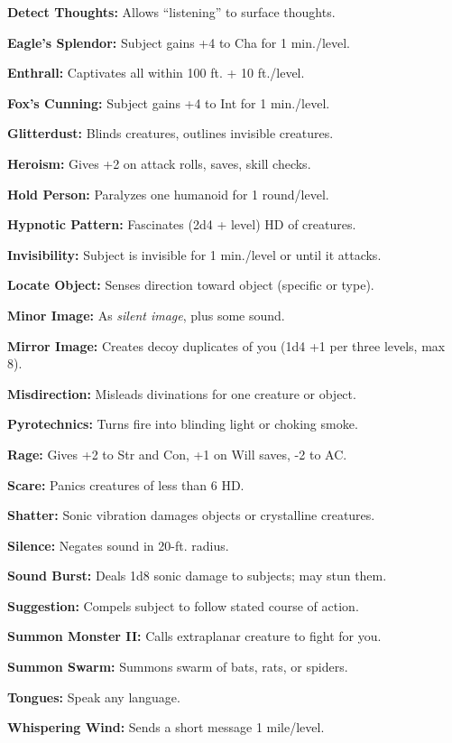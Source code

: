 \documentclass{article}
\begin{document}
\textbf{Detect Thoughts:} Allows ``listening'' to surface thoughts.

\textbf{Eagle's Splendor:} Subject gains +4 to Cha for 1 min./level.

\textbf{Enthrall:} Captivates all within 100 ft. + 10 ft./level.

\textbf{Fox's Cunning:} Subject gains +4 to Int for 1 min./level.

\textbf{Glitterdust:} Blinds creatures, outlines invisible creatures.

\textbf{Heroism:} Gives +2 on attack rolls, saves, skill checks.

\textbf{Hold Person:} Paralyzes one humanoid for 1 round/level.

\textbf{Hypnotic Pattern:} Fascinates (2d4 + level) HD of creatures.

\textbf{Invisibility:} Subject is invisible for 1 min./level or until it attacks.

\textbf{Locate Object:} Senses direction toward object (specific or type).

\textbf{Minor Image:} As \textit{silent image}, plus some sound.

\textbf{Mirror Image:} Creates decoy duplicates of you (1d4 +1 per three levels, 
max 8).

\textbf{Misdirection: }Misleads divinations for one creature or object.

\textbf{Pyrotechnics:} Turns fire into blinding light or choking smoke.

\textbf{Rage:} Gives +2 to Str and Con, +1 on Will saves, -2 to AC.

\textbf{Scare:} Panics creatures of less than 6 HD.

\textbf{Shatter:} Sonic vibration damages objects or crystalline creatures.

\textbf{Silence:} Negates sound in 20-ft. radius.

\textbf{Sound Burst:} Deals 1d8 sonic damage to subjects; may stun them.

\textbf{Suggestion:} Compels subject to follow stated course of action.

\textbf{Summon Monster II:} Calls extraplanar creature to fight for you.

\textbf{Summon Swarm:} Summons swarm of bats, rats, or spiders.

\textbf{Tongues:} Speak any language.

\textbf{Whispering Wind:} Sends a short message 1 mile/level.
\end{document}
